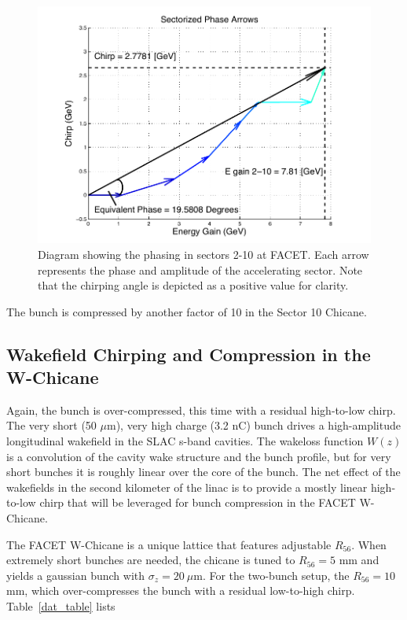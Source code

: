 \documentclass[%
twocolumn,
showpacs,preprintnumbers,
 aps,
prstab,
]{revtex4-1}
\begin{document}
\begin{figure}[hb]
  \includegraphics[width=\columnwidth]{figures/stag.pdf}
  \caption{Diagram showing the phasing in sectors 2-10 at FACET. Each arrow represents the phase and amplitude of the accelerating sector. Note that the chirping angle is depicted as a positive value for clarity.}
  \label{stag}
\end{figure}

The bunch is compressed by another factor of 10 in the Sector 10 Chicane. 

\subsection{Wakefield Chirping and Compression in the W-Chicane}\label{wakes}

Again, the bunch is over-compressed, this time with a residual high-to-low chirp. The very short (50 $\mu$m), very high charge (3.2 nC) bunch drives a high-amplitude longitudinal wakefield in the SLAC s-band cavities. The wakeloss function $W(z)$ is a convolution of the cavity wake structure and the bunch profile, but for very short bunches it is roughly linear over the core of the bunch. The net effect of the wakefields in the second kilometer of the linac is to provide a mostly linear high-to-low chirp that will be leveraged for bunch compression in the FACET W-Chicane.

The FACET W-Chicane is a unique lattice that features adjustable $R_{56}$.  When extremely short bunches are needed, the chicane is tuned to $R_{56} = 5$ mm and yields a gaussian bunch with $\sigma_z = 20~\mu$m. For the two-bunch setup, the $R_{56} = 10$ mm, which over-compresses the bunch with a residual low-to-high chirp. Table~\ref{dat_table} lists 
\end{document}
